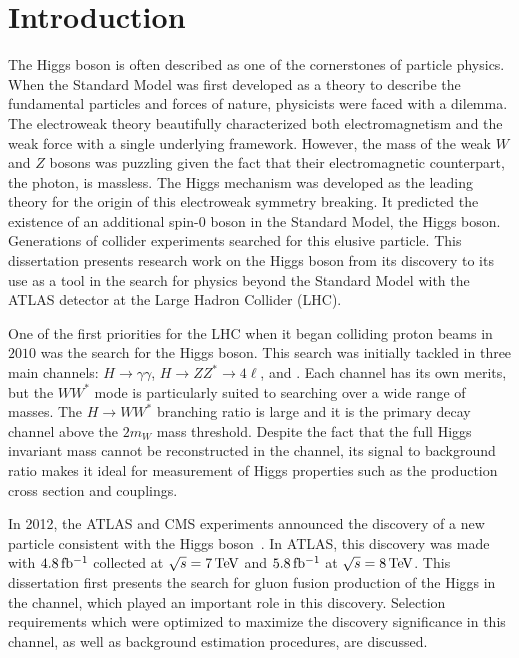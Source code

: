 \chapter{Introduction}
\label{introduction}

The Higgs boson is often described as one of the cornerstones of particle physics. When the Standard Model was first developed as a theory to describe the fundamental particles and forces of nature, physicists were faced with a dilemma. The electroweak theory beautifully characterized both electromagnetism and the weak force with a single underlying framework. However, the mass of the weak $W$ and $Z$ bosons was puzzling given the fact that their electromagnetic counterpart, the photon, is massless. The Higgs mechanism was developed as the leading theory for the origin of this electroweak symmetry breaking. It predicted the existence of an additional spin-$0$ boson in the Standard Model, the Higgs boson. Generations of collider experiments searched for this elusive particle. This dissertation presents research work on the Higgs boson from its discovery to its use as a tool in the search for physics beyond the Standard Model with the ATLAS detector at the Large Hadron Collider (LHC). 

One of the first priorities for the LHC when it began colliding proton beams in $2010$ was the search for the Higgs boson. This search was initially tackled in three main channels: $H\to \gamma\gamma$, $H\to ZZ^* \to 4\ell $, and \HWWfull. Each channel has its own merits, but the $WW^*$ mode is particularly suited to searching over a wide range of masses. The $H\to WW^*$ branching ratio is large and it is the primary decay channel above the $2m_W$ mass threshold. Despite the fact that the full Higgs invariant mass cannot be reconstructed in the \HWWfull channel, its signal to background ratio makes it ideal for measurement of Higgs properties such as the production cross section and couplings. 

In 2012, the ATLAS and CMS experiments announced the discovery of a new particle consistent with the Higgs boson~\cite{Discovery,CMSDiscovery}. In ATLAS, this discovery was made with $4.8 \mbox{\,fb$^{-1}$}$ collected at $\sqrt{s} = 7 \TeV$ and $5.8 \mbox{\,fb$^{-1}$}$ at $\sqrt{s} = 8 \TeV$. This dissertation first presents the search for gluon fusion production of the Higgs in the \HWWfull channel, which played an important role in this discovery. Selection requirements which were optimized to maximize the discovery significance in this channel, as well as background estimation procedures, are discussed. 

